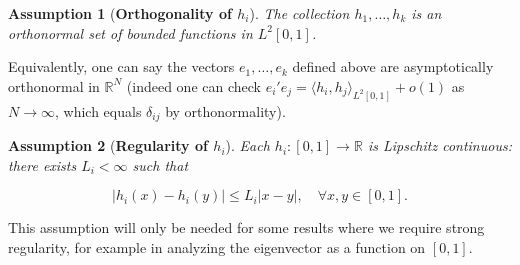 \documentclass[11pt, reqno]{amsart}
\numberwithin{equation}{section}
\newtheorem{assumption}{Assumption}[section]
\begin{document}
\begin{assumption}[{\bf Orthogonality of \(h_i\)}]\label{assump:A2}
    The collection ${h_1,\ldots,h_k}$ is an orthonormal set of bounded functions in $L^2[0,1]$. 
\end{assumption}
Equivalently, one can say the vectors $e_1,\ldots,e_k$
defined above are asymptotically orthonormal in $\mathbb{R}^N$ (indeed one can check $e_i' e_j =
\langle h_i, h_j\rangle_{L^2[0,1]} + o(1)$ as $N\to\infty$, which equals $\delta_{ij}$ by
orthonormality).

\begin{assumption}[{\bf Regularity of $h_i$}]\label{assump:A3} Each $h_i: [0,1]\to\mathbb R$ is Lipschitz continuous: there exists $L_i < \infty$ such that

\[
        |h_i(x) - h_i(y)| \leq L_i |x - y|, \quad \forall x, y \in [0,1].
    \]

\end{assumption}
This assumption will only be needed for some results where we require strong regularity, for example in analyzing the eigenvector as a function on $[0,1]$.\\

\medskip
\end{document}
